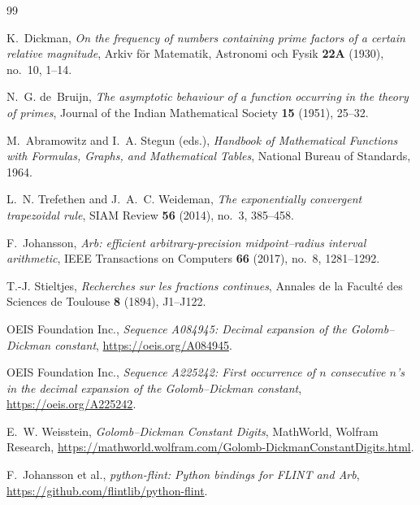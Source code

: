 \documentclass[11pt,a4paper]{article}
\theoremstyle{remark}
\begin{document}
\begin{thebibliography}{99}

K.~Dickman,
\emph{On the frequency of numbers containing prime factors of a certain
relative magnitude},
Arkiv f\"or Matematik, Astronomi och Fysik \textbf{22A} (1930), no.~10,
1--14.

N.~G. de~Bruijn,
\emph{The asymptotic behaviour of a function occurring in the theory of
primes},
Journal of the Indian Mathematical Society \textbf{15} (1951), 25--32.

M.~Abramowitz and I.~A. Stegun (eds.),
\emph{Handbook of Mathematical Functions with Formulas, Graphs, and
Mathematical Tables},
National Bureau of Standards, 1964.

L.~N. Trefethen and J.~A.~C. Weideman,
\emph{The exponentially convergent trapezoidal rule},
SIAM Review \textbf{56} (2014), no.~3, 385--458.

F.~Johansson,
\emph{Arb: efficient arbitrary-precision midpoint--radius interval
arithmetic},
IEEE Transactions on Computers \textbf{66} (2017), no.~8, 1281--1292.

T.-J. Stieltjes,
\emph{Recherches sur les fractions continues},
Annales de la Facult\'e des Sciences de Toulouse \textbf{8} (1894),
J1--J122.

OEIS Foundation Inc.,
\emph{Sequence A084945: Decimal expansion of the Golomb--Dickman
constant},
\url{https://oeis.org/A084945}.

OEIS Foundation Inc.,
\emph{Sequence A225242: First occurrence of $n$ consecutive $n$'s in the
decimal expansion of the Golomb--Dickman constant},
\url{https://oeis.org/A225242}.

E.~W. Weisstein,
\emph{Golomb--Dickman Constant Digits},
MathWorld, Wolfram Research,
\url{https://mathworld.wolfram.com/Golomb-DickmanConstantDigits.html}.

F.~Johansson et al.,
\emph{python-flint: Python bindings for FLINT and Arb},
\url{https://github.com/flintlib/python-flint}.

\end{thebibliography}
\end{document}
